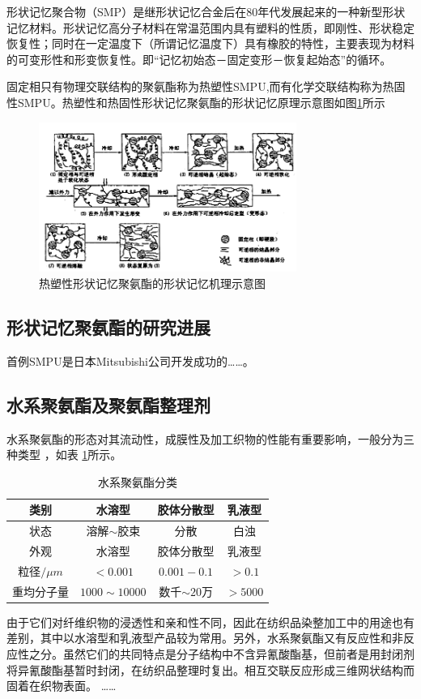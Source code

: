 形状记忆聚合物（SMP）是继形状记忆合金后在80年代发展起来的一种新型形状记忆材料。形状记忆高分子材料在常温范围内具有塑料的性质，即刚性、形状稳定恢复性；同时在一定温度下（所谓记忆温度下）具有橡胶的特性，主要表现为材料的可变形性和形变恢复性。即“记忆初始态－固定变形－恢复起始态”的循环。

固定相只有物理交联结构的聚氨酯称为热塑性SMPU,而有化学交联结构称为热固性SMPU。热塑性和热固性形状记忆聚氨酯的形状记忆原理示意图如图\ref{fig:diagram}所示

\begin{figure}
 \centering
 \includegraphics[width=0.75\textwidth]{figures/figure1}
 \caption{热塑性形状记忆聚氨酯的形状记忆机理示意图}\label{fig:diagram}
\end{figure}


\subsection{形状记忆聚氨酯的研究进展}
首例SMPU是日本Mitsubishi公司开发成功的……。

\subsection{水系聚氨酯及聚氨酯整理剂}

水系聚氨酯的形态对其流动性，成膜性及加工织物的性能有重要影响，一般分为三种类型 ，如表 \ref{tab:category}所示。

\begin{table}
  \centering
  \caption{水系聚氨酯分类} \label{tab:category}
  \begin{tabular*}{0.9\textwidth}{@{\extracolsep{\fill}}cccc}
  \toprule
    类别			&水溶型		&胶体分散型		&乳液型 \\
  \midrule
    状态			&溶解$\sim$胶束	&分散		&白浊 \\
    外观			&水溶型		&胶体分散型		&乳液型 \\
    粒径$/\mu m$	&$<0.001$		&$0.001-0.1$		&$>0.1$ \\
    重均分子量	&$1000\sim 10000$	&数千$\sim 20万$ &$>5000$ \\
  \bottomrule
  \end{tabular*}
\end{table}

由于它们对纤维织物的浸透性和亲和性不同，因此在纺织品染整加工中的用途也有差别，其中以水溶型和乳液型产品较为常用。另外，水系聚氨酯又有反应性和非反应性之分。虽然它们的共同特点是分子结构中不含异氰酸酯基，但前者是用封闭剂将异氰酸酯基暂时封闭，在纺织品整理时复出。相互交联反应形成三维网状结构而固着在织物表面。
……

